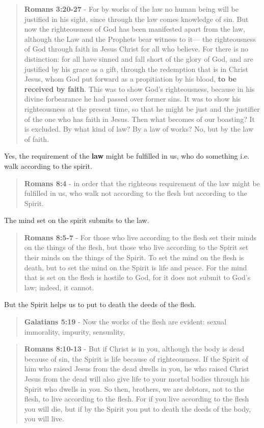 \documentclass[11pt]{article}
\begin{document}
\begin{quote}
\textbf{Romans 3:20-27} - For by works of the law no human being will be justified in his sight, since through the law comes knowledge of sin. But now the righteousness of God has been manifested apart from the law, although the Law and the Prophets bear witness to it— the righteousness of God through faith in Jesus Christ for all who believe. For there is no distinction: for all have sinned and fall short of the glory of God, and are justified by his grace as a gift, through the redemption that is in Christ Jesus, whom God put forward as a propitiation by his blood, \textbf{to be received by faith}. This was to show God's righteousness, because in his divine forbearance he had passed over former sins. It was to show his righteousness at the present time, so that he might be just and the justifier of the one who has faith in Jesus. Then what becomes of our boasting? It is excluded. By what kind of law? By a law of works? No, but by the law of faith.
\end{quote}

Yes, the requirement of the \textbf{law} might be fulfilled in us, who do something i.e. walk according to the spirit.

\begin{quote}
\textbf{Romans 8:4} - in order that the righteous requirement of the law might be fulfilled in us, who walk not according to the flesh but according to the Spirit.
\end{quote}

The mind set on the spirit submits to the law.

\begin{quote}
\textbf{Romans 8:5-7} - For those who live according to the flesh set their minds on the things of the flesh, but those who live according to the Spirit set their minds on the things of the Spirit.  To set the mind on the flesh is death, but to set the mind on the Spirit is life and peace.  For the mind that is set on the flesh is hostile to God, for it does not submit to God's law; indeed, it cannot.
\end{quote}

But the Spirit helps us to put to death the deeds of the flesh.

\begin{quote}
\textbf{Galatians 5:19} - Now the works of the flesh are evident: sexual immorality, impurity, sensuality,
\end{quote}

\begin{quote}
\textbf{Romans 8:10-13} - But if Christ is in you, although the body is dead because of sin, the Spirit is life because of righteousness. If the Spirit of him who raised Jesus from the dead dwells in you, he who raised Christ Jesus from the dead will also give life to your mortal bodies through his Spirit who dwells in you. So then, brothers, we are debtors, not to the flesh, to live according to the flesh. For if you live according to the flesh you will die, but if by the Spirit you put to death the deeds of the body, you will live.
\end{quote}
\end{document}
